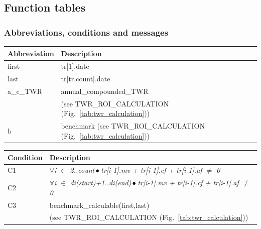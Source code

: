 \documentclass[runningheads,12pt]{article}
\begin{document}










\newpage

\subsection{Function tables}

\subsubsection{Abbreviations, conditions and messages}
{\centering
\begin{longtable}{|l|p{11cm}|}
\hline
\textbf{Abbreviation} & \textbf{Description}\\

\hline
first & tr[1].date \\

\hline
last & tr[tr.count].date\\

\hline
 a\_c\_TWR & annual\_compounded\_TWR\\
& (see TWR\_ROI\_CALCULATION (Fig.~\ref{tab:twr_calculation})) \\

\hline
 b & benchmark (see TWR\_ROI\_CALCULATION (Fig.~\ref{tab:twr_calculation}))\\



\hline
\end{longtable}

\centering
\begin{longtable}{|l|p{12cm}|}
\hline
\textbf{Condition} & \textbf{Description}\\

\hline
C1 & \textit{$\forall$i $\in$ 2..count$\,\bullet\,$tr[i-1].mv + tr[i-1].cf + tr[i-1].af $\neq$ 0}\\

\hline
C2 & \textit{$\forall$i $\in$ di(start)+1..di(end)$\,\bullet\,$tr[i-1].mv + tr[i-1].cf + tr[i-1].af $\neq$ 0}\\

\hline
C3 & benchmark\_calculable(first,last)\\
& (see TWR\_ROI\_CALCULATION (Fig.~\ref{tab:twr_calculation}))\\


\end{longtable}}
\end{document}
